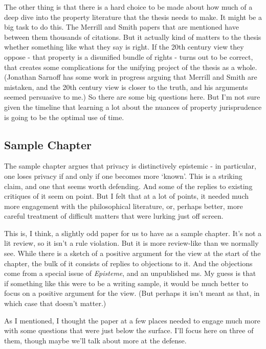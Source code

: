 \documentclass[
  letterpaper,
  DIV=11,
  numbers=noendperiod]{scrartcl}
\begin{document}
The other thing is that there is a hard choice to be made about how much
of a deep dive into the property literature that the thesis needs to
make. It might be a big task to do this. The Merrill and Smith papers
that are mentioned have between them thousands of citations. But it
actually kind of matters to the thesis whether something like what they
say is right. If the 20th century view they oppose - that property is a
disunified bundle of rights - turns out to be correct, that creates some
complications for the unifying project of the thesis as a whole.
(Jonathan Sarnoff has some work in progress arguing that Merrill and
Smith are mistaken, and the 20th century view is closer to the truth,
and his arguments seemed persuasive to me.) So there are some big
questions here. But I'm not sure given the timeline that learning a lot
about the nuances of property jurisprudence is going to be the optimal
use of time.

\hypertarget{sample-chapter}{%
\subsection{Sample Chapter}\label{sample-chapter}}

The sample chapter argues that privacy is distinctively epistemic - in
particular, one loses privacy if and only if one becomes more `known'.
This is a striking claim, and one that seems worth defending. And some
of the replies to existing critiques of it seem on point. But I felt
that at a lot of points, it needed much more engagement with the
philosophical literature, or, perhaps better, more careful treatment of
difficult matters that were lurking just off screen.

This is, I think, a slightly odd paper for us to have as a sample
chapter. It's not a lit review, so it isn't a rule violation. But it is
more review-like than we normally see. While there is a sketch of a
positive argument for the view at the start of the chapter, the bulk of
it consists of replies to objections to it. And the objections come from
a special issue of \emph{Episteme}, and an unpublished ms. My guess is
that if something like this were to be a writing sample, it would be
much better to focus on a positive argument for the view. (But perhaps
it isn't meant as that, in which case that doesn't matter.)

As I mentioned, I thought the paper at a few places needed to engage
much more with some questions that were just below the surface. I'll
focus here on three of them, though maybe we'll talk about more at the
defense.
\end{document}
